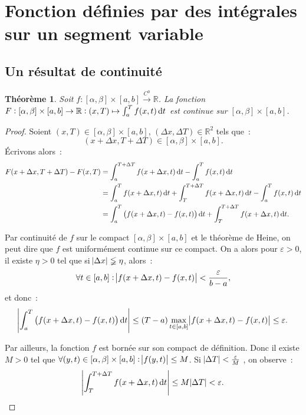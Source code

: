 \documentclass{report}
\newtheorem{thm}{Théorème}[chapter]
\theoremstyle{definition}
\theoremstyle{remark}
\numberwithin{equation}{section}
\newcommand{\R}{\mathbb R}
\newcommand{\toC}[1]{\xrightarrow{C^{#1}}}
\newcommand{\tocont}{\toC 0}
\begin{document}
	\section{Fonction définies par des intégrales sur un segment variable}
		\subsection{Un résultat de continuité}
			\begin{thm}\label{thm:continuitésegmentvariable} Soit $f : [\alpha, \beta] \times [a, b] \tocont \R$. La fonction
			$F : [\alpha, \beta] \times [a, b] \to \R : (x, T) \mapsto \int_a^Tf(x, t)\dif t$ est continue sur $[\alpha, \beta] \times [a, b]$.
			\end{thm}

			\begin{proof} Soient $(x, T) \in [\alpha, \beta] \times [a, b]$, $(\Delta x, \Delta T) \in \R^2$ tels que~:
			\begin{equation}
				(x + \Delta x, T + \Delta T) \in [\alpha, \beta] \times [a, b].
			\end{equation}
			Écrivons alors~:
			\begin{align}
				F(x + \Delta x, T + \Delta T) - F(x, T) &= \int_a^{T+\Delta T}f(x+\Delta x, t)\dif t - \int_a^Tf(x, t)\dif t \\
				&= \int_a^Tf(x+\Delta x, t)\dif t + \int_T^{T+\Delta T}f(x +\Delta x, t)\dif t - \int_a^Tf(x, t)\dif t \\
				&= \int_a^T\left(f(x+\Delta x, t) - f(x, t)\right)\dif t + \int_T^{T + \Delta T}f(x+\Delta x, t)\dif t.
			\end{align}

			Par continuité de $f$ sur le compact $[\alpha, \beta] \times [a, b]$ et le théorème de Heine, on peut dire que $f$ est uniformément continue sur
			ce compact. On a alors pour $\varepsilon > 0$, il existe $\eta > 0$ tel que si $\abs {\Delta x} \lneqq \eta$, alors~:
			\begin{equation}
				\forall t \in [a, b] : \abs {f(x+\Delta x, t) - f(x, t)} < \frac \varepsilon{b-a},
			\end{equation}
			et donc~:
			\begin{equation}
				\abs {\int_a^T\left(f(x+\Delta x, t) - f(x, t)\right)\dif t} \leq (T-a)\max_{t \in [a, b]}\abs {f(x+\Delta x, t) - f(x, t)} \leq \varepsilon.
			\end{equation}

			Par ailleurs, la fonction $f$ est bornée sur son compact de définition. Donc il existe $M > 0$ tel que
			$\forall (y, t) \in [\alpha, \beta] \times [a, b] : \abs {f(y, t)} \leq M$. Si $\abs {\Delta T} < \frac \varepsilon M$ , on observe~:
			\begin{equation}
				\abs {\int_T^{T + \Delta T}f(x + \Delta x, t)\dif t} \leq M\abs {\Delta T} < \varepsilon.
			\end{equation}


\end{proof}
\end{document}
